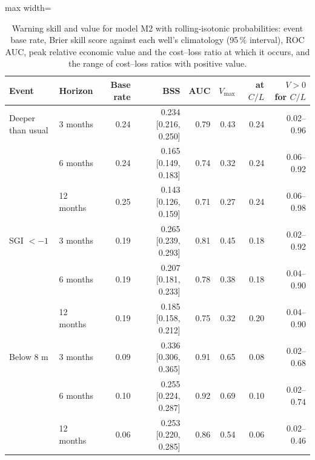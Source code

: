 \begin{table}[t]
\caption{Warning skill and value for model M2 with rolling-isotonic probabilities: event base rate, Brier skill score against each well's climatology (95\,\% interval), ROC AUC, peak relative economic value and the cost--loss ratio at which it occurs, and the range of cost--loss ratios with positive value.}
\label{tab:value}
\centering\small
\begin{adjustbox}{max width=\textwidth}
\begin{tabular}{llrrrrrr}
\toprule
Event & Horizon & Base rate & BSS & AUC & $V_{\max}$ & at $C/L$ & $V>0$ for $C/L$ \\
\midrule
Deeper than usual & 3 months & 0.24 & 0.234 [0.216, 0.250] & 0.79 & 0.43 & 0.24 & 0.02--0.96 \\
 & 6 months & 0.24 & 0.165 [0.149, 0.183] & 0.74 & 0.32 & 0.24 & 0.06--0.92 \\
 & 12 months & 0.25 & 0.143 [0.126, 0.159] & 0.71 & 0.27 & 0.24 & 0.06--0.98 \\
SGI $<-1$ & 3 months & 0.19 & 0.265 [0.239, 0.293] & 0.81 & 0.45 & 0.18 & 0.02--0.92 \\
 & 6 months & 0.19 & 0.207 [0.181, 0.233] & 0.78 & 0.38 & 0.18 & 0.04--0.90 \\
 & 12 months & 0.19 & 0.185 [0.158, 0.212] & 0.75 & 0.32 & 0.20 & 0.04--0.90 \\
Below 8 m & 3 months & 0.09 & 0.336 [0.306, 0.365] & 0.91 & 0.65 & 0.08 & 0.02--0.68 \\
 & 6 months & 0.10 & 0.255 [0.224, 0.287] & 0.92 & 0.69 & 0.10 & 0.02--0.74 \\
 & 12 months & 0.06 & 0.253 [0.220, 0.285] & 0.86 & 0.54 & 0.06 & 0.02--0.46 \\
\bottomrule
\end{tabular}
\end{adjustbox}
\end{table}
